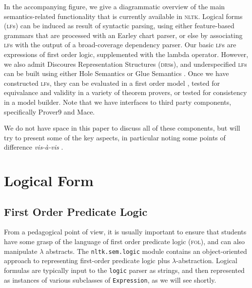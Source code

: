 \documentclass[11pt,a4paper]{article}
\newcommand{\DRS}{\textsc{drs}}
\newcommand{\FOL}{\textsc{fol}}
\newcommand{\NLTK}{\textsc{nltk}}
\newcommand{\LF}{\textsc{lf}}
\newcommand{\dhgcode}[1]{{\tt #1}}
\begin{document}
In the accompanying figure, we give a diagrammatic overview of the main
semantics-related functionality that is currently available in \NLTK.
Logical forms (\LF s) can be induced as result of syntactic parsing,
using either feature-based grammars that are processed with an Earley
chart parser, or else by associating \LF s with the output of a
broad-coverage dependency parser. Our basic \LF s are expressions of
first order logic, supplemented with the lambda operator. However, we
also admit Discoures Representation Structures (\DRS s), and
underspecified \LF s can be built using either Hole Semantics
\citep{BB} or Glue Semantics \citep{Dalrymple2001}. Once we have
constructed \LF s, they can be evaluated in a first order model
\citep{Klein06altw}, tested for equivalance and validity in a variety
of theorem provers, or tested for consistency in a model builder. Note
that we have interfaces to third party components, specifically
Prover9 and Mace.

We do not have space in this paper to discuss all of these components,
but will try to present some of the key aspects, in particular noting
some points of difference \textit{vis-\`a-vis} \citet{BB}.


\section{Logical Form}

\subsection{First Order Predicate Logic}
From a pedagogical point of view, it is usually important to ensure
that students have some grasp of the language of first order predicate
logic (\FOL), and can also manipulate $\lambda$ abstracts.  The
\dhgcode{nltk.sem.logic} module contains an object-oriented approach
to representing first-order predicate logic plus
$\lambda$-abstraction. Logical formulas are typically input to the
\texttt{logic} parser as strings, and then represented as instances of
various subclasses of \texttt{Expression}, as we will see shortly.



\end{document}
